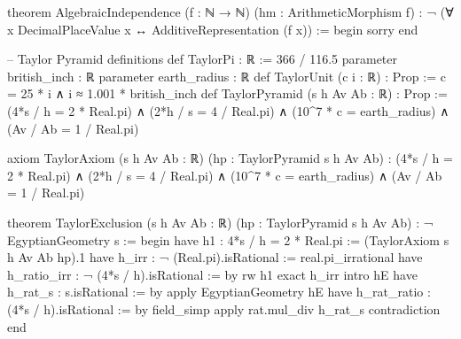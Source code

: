 \documentclass[12pt]{amsart}
\begin{document}
\begin{leanlisting}
	theorem AlgebraicIndependence (f : ℕ → ℕ) (hm : ArithmeticMorphism f) :
	¬ (∀ x   DecimalPlaceValue x ↔ AdditiveRepresentation (f x)) :=
	begin
	sorry
	end
	
	-- Taylor Pyramid definitions
	def TaylorPi : ℝ := 366 / 116.5
	parameter british_inch : ℝ
	parameter earth_radius : ℝ
	def TaylorUnit (c i : ℝ) : Prop := c = 25 * i ∧ i ≈ 1.001 * british_inch
	def TaylorPyramid (s h Av Ab : ℝ) : Prop :=
	(4*s / h = 2 * Real.pi) ∧
	(2*h / s = 4 / Real.pi) ∧
	(10^7 * c = earth_radius) ∧
	(Av / Ab = 1 / Real.pi)
	
	axiom TaylorAxiom (s h Av Ab : ℝ) (hp : TaylorPyramid s h Av Ab) :
	(4*s / h = 2 * Real.pi) ∧
	(2*h / s = 4 / Real.pi) ∧
	(10^7 * c = earth_radius) ∧
	(Av / Ab = 1 / Real.pi)
	
	theorem TaylorExclusion (s h Av Ab : ℝ) (hp : TaylorPyramid s h Av Ab) :
	¬ EgyptianGeometry s :=
	begin
	have h1 : 4*s / h = 2 * Real.pi := (TaylorAxiom s h Av Ab hp).1  
	have h_irr : ¬ (Real.pi).isRational := real.pi_irrational  
	have h_ratio_irr : ¬ (4*s / h).isRational := by
	rw h1  
	exact h_irr  
	intro hE  
	have h_rat_s : s.isRational := by
	apply EgyptianGeometry hE  
	have h_rat_ratio : (4*s / h).isRational := by
	field_simp  
	apply rat.mul_div h_rat_s  
	contradiction  
	end
\end{leanlisting}

\end{document}
